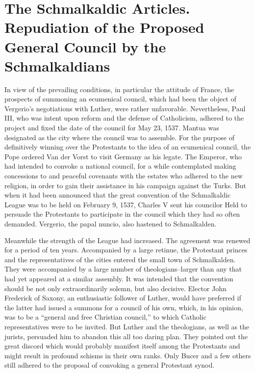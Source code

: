 \section{The Schmalkaldic Articles. Repudiation of the Proposed General Council by the Schmalkaldians}

In view of the prevailing conditions, in particular the attitude of
France, the prospects of summoning an ecumenical council, which
had been the object of Vergerio’s negotiations with Luther, were
rather unfavorable. Nevertheless, Paul III, who was intent upon reform
and the defense of Catholicism, adhered to the project and
fixed the date of the council for May 23, 1537. Mantua was designated
as the city where the council was to assemble. For the purpose
of definitively winning over the Protestants to the idea of an ecumenical
council, the Pope ordered Van der Vorst to visit Germany
as his legate. The Emperor, who had intended to convoke a national
council, for a while contemplated making concessions to and peaceful
covenants with the estates who adhered to the new religion, in order
to gain their assistance in his campaign against the Turks. But when
it had been announced that the great convention of the Schmalkaldic
League was to be held on February 9, 1537, Charles V sent his councilor
Held to persuade the Protestants to participate in the council
which they had so often demanded. Vergerio, the papal nuncio, also
hastened to Schmalkalden.

Meanwhile the strength of the League had increased. The agreement
was renewed for a period of ten years. Accompanied by a large retinue,
the Protestant princes and the representatives of the cities entered the
small town of Schmalkalden. They were accompanied by a
large number of theologians--larger than any that had yet appeared
at a similar assembly. It was intended that the convention should be
not only extraordinarily solemn, but also decisive. Elector John Frederick
of Saxony, an enthusiastic follower of Luther, would have preferred if
the latter had issued a summons for a council of his own,
which, in his opinion, was to be a “general and free Christian council,”
to which Catholic representatives were to be invited. But Luther
and the theologians, as well as the jurists, persuaded him to abandon
this all too daring plan. They pointed out the great discord which
would probably manifest itself among the Protestants and might result
in profound schisms in their own ranks. Only Bucer and a few
others still adhered to the proposal of convoking a general Protestant
synod.

